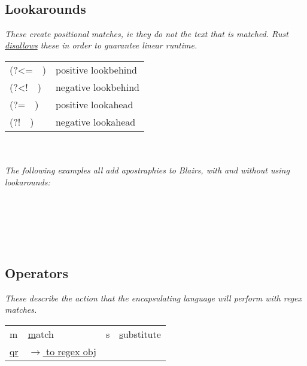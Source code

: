 \\



\subsection*{Lookarounds}
\textit{These create positional matches, ie they do not  the text that is matched. Rust \href{https://docs.rs/regex/1.4.3/regex/}{disallows} these in order to guarantee linear runtime.}\\
\begin{tabular}{l  l}
    (?<= \,\, )     &   positive lookbehind \\
    (?<! \,\, )     &   negative lookbehind \\
    (?= \,\, )      &   positive lookahead  \\
    (?! \,\, )      &   negative lookahead  \\
\end{tabular} \\[1mm]
\\
[2mm]
\textit{The following examples all add apostraphies to \textquotesingle Blairs\textquotesingle, with and without using lookarounds:}\\
\\
\\
\\
\\
\\


\subsection*{Operators}
\textit{These describe the action that the encapsulating language will perform with regex matches.}\\
\begin{tabular}{l  l  l  l}
    m   &   \ul{m}atch              &
    s   &   \ul{s}ubstitute         \\
    \href{https://perldoc.perl.org/perlop\#Regexp-Quote-Like-Operators}{qr}  &   \href{https://perldoc.perl.org/perlop\#Regexp-Quote-Like-Operators}{$\to$ to regex obj}    &
\end{tabular}

